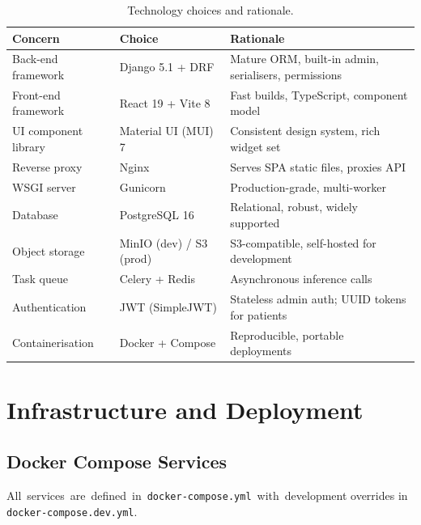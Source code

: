 \documentclass[12pt,a4paper]{article}
\begin{document}
\begin{table}[H]
\centering
\caption{Technology choices and rationale.}
\label{tab:tech-stack}
\begin{tabularx}{\textwidth}{l l X}
\toprule
\textbf{Concern} & \textbf{Choice} & \textbf{Rationale} \\
\midrule
Back-end framework   & Django 5.1 + DRF     & Mature ORM, built-in admin, serialisers, permissions \\
Front-end framework  & React 19 + Vite 8    & Fast builds, TypeScript, component model \\
UI component library & Material UI (MUI) 7  & Consistent design system, rich widget set \\
Reverse proxy        & Nginx                & Serves SPA static files, proxies API \\
WSGI server          & Gunicorn             & Production-grade, multi-worker \\
Database             & PostgreSQL 16        & Relational, robust, widely supported \\
Object storage       & MinIO (dev) / S3 (prod) & S3-compatible, self-hosted for development \\
Task queue           & Celery + Redis       & Asynchronous inference calls \\
Authentication       & JWT (SimpleJWT)      & Stateless admin auth; UUID tokens for patients \\
Containerisation     & Docker + Compose     & Reproducible, portable deployments \\
\bottomrule
\end{tabularx}
\end{table}

\section{Infrastructure and Deployment}
\label{sec:infrastructure}

\subsection{Docker Compose Services}

\hbox{All services are defined in \texttt{docker-compose.yml} with development}
overrides in \texttt{docker-compose.dev.yml}.
\end{document}

